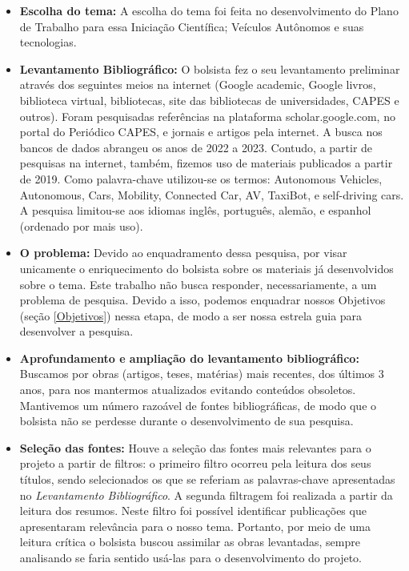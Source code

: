 \begin{itemize}

\item \textbf{Escolha do tema:} A escolha do tema foi feita no desenvolvimento do Plano de Trabalho para essa Iniciação Científica; Veículos Autônomos e suas tecnologias. 

\item \textbf{Levantamento Bibliográfico:} O bolsista fez o seu levantamento preliminar através dos seguintes meios na internet (Google academic, Google livros, biblioteca virtual, bibliotecas, site das bibliotecas de universidades, CAPES e outros). Foram pesquisadas referências na plataforma scholar.google.com, no portal do Periódico CAPES, e jornais e artigos pela internet. A busca nos bancos de dados abrangeu os anos de 2022 a 2023. Contudo, a partir de pesquisas na internet, também, fizemos uso de materiais publicados a partir de 2019. Como palavra-chave utilizou-se os termos: Autonomous Vehicles, Autonomous, Cars, Mobility, Connected Car, AV, TaxiBot, e self-driving cars.  A pesquisa limitou-se aos idiomas inglês, português,  alemão, e espanhol (ordenado por mais uso).


\item \textbf{O problema:} Devido ao enquadramento dessa pesquisa, por visar unicamente o enriquecimento do bolsista sobre os materiais já desenvolvidos sobre o tema. Este trabalho não busca responder, necessariamente, a um problema de pesquisa. Devido a isso, podemos enquadrar nossos Objetivos (seção \ref{Objetivos}) nessa etapa, de modo a ser nossa estrela guia para desenvolver a pesquisa.

\item \textbf{Aprofundamento e ampliação do levantamento bibliográfico:} Buscamos por obras (artigos, teses, matérias) mais recentes, dos últimos 3 anos, para nos mantermos atualizados evitando conteúdos obsoletos. Mantivemos um número razoável de fontes bibliográficas, de modo que o bolsista não se perdesse durante o desenvolvimento de sua pesquisa. 

\item \textbf{Seleção das fontes:} Houve a seleção das fontes mais relevantes para o projeto a partir de filtros: o primeiro filtro ocorreu pela leitura dos seus títulos, sendo selecionados os que se referiam as palavras-chave apresentadas no \textit{Levantamento Bibliográfico}. A segunda filtragem foi realizada a partir da leitura dos resumos. Neste filtro foi possível identificar publicações que apresentaram relevância para o nosso tema.
Portanto, por meio de uma leitura crítica o bolsista buscou assimilar as obras levantadas, sempre analisando se faria sentido usá-las para o desenvolvimento do projeto. 


\end{itemize}
